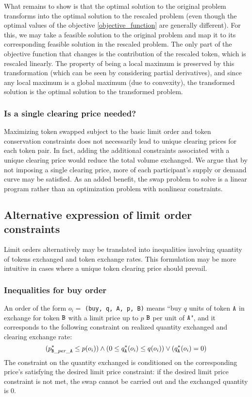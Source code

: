 \documentclass[11pt, reqno]{amsart}
\theoremstyle{definition}
\theoremstyle{remark}
\newcommand{\tA}{\textnormal{\texttt{A}}}
\newcommand{\tB}{\textnormal{\texttt{B}}}
\newcommand{\buy}{\textnormal{\texttt{buy}}}
\begin{document}
What remains to show is that the optimal solution to the original problem
transforms into the optimal solution to the rescaled problem (even though
the optimal values of the objective \eqref{objective_function} are generally
different).
For this, we may take a feasible solution to the original problem and map
it to its corresponding feasible solution in the rescaled problem. The
only part of the objective function that changes is the contribution of
the rescaled token, which is rescaled linearly. The property of being
a local maximum is preserved by this transformation (which can be seen by
considering partial derivatives), and since any local
maximum is a global maximum (due to convexity), the transformed solution
is the optimal solution to the transformed problem.

\subsubsection{Is a single clearing price needed?}

Maximizing token swapped subject to the basic limit order and token
conservation constraints does not necessarily lead to unique clearing prices
for each token pair. In fact, adding the additional constraints associated
with a unique clearing price would reduce the total volume exchanged. We
argue that by not imposing a single clearing price, more of each participant's
supply or demand curve may be satisfied. As an added benefit, the swap
problem to solve is a linear program rather than an optimization problem with
nonlinear constraints.


\subsection{Alternative expression of limit order constraints}
Limit orders alternatively may be translated into inequalities involving
quantity of tokens exchanged and token exchange rates. This formulation may be
more intuitive in cases where a unique token clearing price should prevail.

\subsubsection{Inequalities for buy order}
An order of the form $o_i =$ \texttt{(\buy, q, \tA, p, \tB)} means
``buy $q$ units of token $\tA$ in exchange for token $\tB$ with a limit price
up to $p$ $\tB$ per unit of $\tA$",
and it corresponds to the following constraint on realized quantity exchanged
and clearing exchange rate:
\begin{equation*}
	(p_{\tB\_per\_\tA}^* \leq p(o_i)) \land
	(0 \le q_\tA^*(o_i) \leq q(o_i)) \lor
	(q_\tA^*(o_i) = 0)
\end{equation*}
The constraint on the quantity exchanged is conditioned on the corresponding
price's satisfying the desired limit price constraint: if the desired limit price
constraint is not met, the swap cannot be carried out and the exchanged quantity
is 0.
\end{document}
